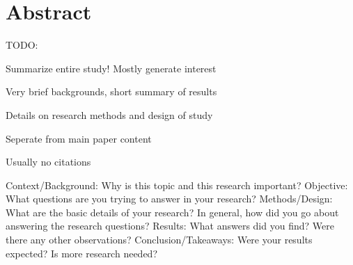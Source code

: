 \chapter*{Abstract}
TODO:

Summarize entire study! Mostly generate interest

Very brief backgrounds, short summary of results

Details on research methods and design of study

Seperate from main paper content

Usually no citations


Context/Background: Why is this topic and this research important?
Objective: What questions are you trying to answer in your research?
Methods/Design: What are the basic details of your research? In general, how did you go about answering the research questions? 
Results: What answers did you find? Were there any other observations?
Conclusion/Takeaways: Were your results expected? Is more research needed?